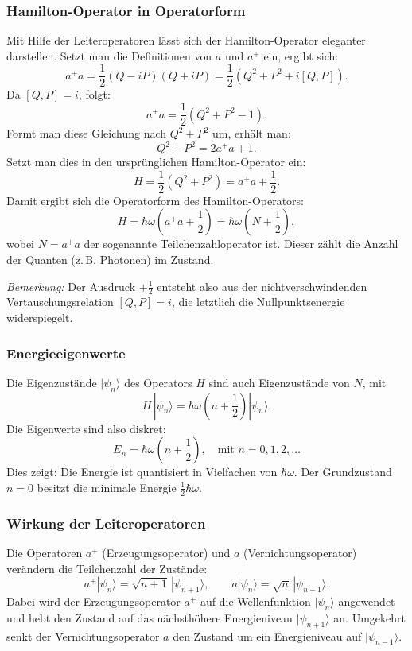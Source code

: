 		\subsubsection{Hamilton-Operator in Operatorform\label{fourier:subsubsection:HamiltonOperatorInOperatorform}}

			Mit Hilfe der Leiteroperatoren lässt sich der Hamilton-Operator eleganter darstellen. Setzt man die Definitionen von $a$ und $a^+$ ein, ergibt sich:
			\[
				a^+a = \frac{1}{2}(Q - iP)(Q + iP) = \frac{1}{2}(Q^2 + P^2 + i[Q, P]).
			\]
			Da $[Q, P] = i$, folgt:
			\[
				a^+a = \frac{1}{2}(Q^2 + P^2 - 1).
			\]
			Formt man diese Gleichung nach $Q^2 + P^2$ um, erhält man:
			\[
				Q^2 + P^2 = 2a^+a + 1.
			\]
			Setzt man dies in den ursprünglichen Hamilton-Operator ein:
			\[
				H = \frac{1}{2}(Q^2 + P^2) = a^+a + \frac{1}{2}.
			\]
			Damit ergibt sich die Operatorform des Hamilton-Operators:
			\begin{equation}
				H = \hbar\omega \left(a^+ a + \frac{1}{2}\right) = \hbar\omega \left(N + \frac{1}{2}\right),
			\end{equation}
			wobei $N = a^+a$ der sogenannte Teilchenzahloperator ist. Dieser zählt die Anzahl der Quanten (z.\,B. Photonen) im Zustand.

			\textit{Bemerkung:}
			Der Ausdruck $+\tfrac{1}{2}$ entsteht also aus der nichtverschwindenden Vertauschungsrelation $[Q,P] = i$, die letztlich die Nullpunktsenergie widerspiegelt.

		\subsubsection{Energieeigenwerte\label{fourier:subsubsection:Energieeigenwerte}}
			Die Eigenzustände $|\psi_n\rangle$ des Operators $H$ sind auch Eigenzustände von $N$, mit
			\begin{equation}
				H\,|\psi_n\rangle = \hbar\omega\left(n + \frac{1}{2}\right) |\psi_n\rangle.
			\end{equation}
			Die Eigenwerte sind also diskret:
			\[
				E_n = \hbar\omega\left(n + \frac{1}{2}\right), \quad \text{mit } n = 0,1,2,\dots
			\]
			Dies zeigt:
			Die Energie ist quantisiert in Vielfachen von $\hbar\omega$.
			Der Grundzustand $n = 0$ besitzt die minimale Energie $\tfrac{1}{2}\hbar\omega$.

		\subsubsection{Wirkung der Leiteroperatoren\label{fourier:subsubsection:WirkungLeiteroperatoren}}
			Die Operatoren $a^+$ (Erzeugungsoperator) und $a$ (Vernichtungsoperator) verändern die Teilchenzahl der Zustände:
			\[
				a^+|\psi_n\rangle = \sqrt{n+1}\,|\psi_{n+1}\rangle,
				\qquad
				a|\psi_n\rangle = \sqrt{n}\,|\psi_{n-1}\rangle.
			\]
			Dabei wird der Erzeugungsoperator $a^+$ auf die Wellenfunktion $|\psi_n\rangle$ angewendet und hebt den Zustand auf das nächsthöhere Energieniveau $|\psi_{n+1}\rangle$ an.
			Umgekehrt senkt der Vernichtungsoperator $a$ den Zustand um ein Energieniveau auf $|\psi_{n-1}\rangle$.
			

